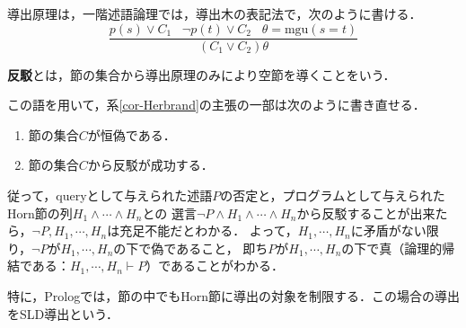 \documentclass[uplatex, dvipdfmx]{jsreport}
\begin{document}
\begin{definition}[導出：一階述語論理]
    導出原理は，一階述語論理では，導出木の表記法で，次のように書ける．
    \[ \frac{p(s)\lor C_1\;\;\;\lnot p(t)\lor C_2\;\;\;\theta=\mathrm{mgu}(s=t)}{(C_1\lor C_2)\theta} \]
\end{definition}

\begin{definition}[refutation]
    \textbf{反駁}とは，節の集合から導出原理のみにより空節を導くことをいう．
\end{definition}
\begin{remark}
    この語を用いて，系\ref{cor-Herbrand}の主張の一部は次のように書き直せる．
    \begin{enumerate}
        \item 節の集合$C$が恒偽である．
        \item 節の集合$C$から反駁が成功する．
    \end{enumerate}
    従って，queryとして与えられた述語$P$の否定と，プログラムとして与えられたHorn節の列$H_1\land\cdots\land H_n$との
    選言$\lnot P\land H_1\land\cdots\land H_n$から反駁することが出来たら，$\lnot P,H_1,\cdots,H_n$は充足不能だとわかる．
    よって，$H_1,\cdots,H_n$に矛盾がない限り，$\lnot P$が$H_1,\cdots,H_n$の下で偽であること，
    即ち$P$が$H_1,\cdots,H_n$の下で真（論理的帰結である：$H_1,\cdots,H_n\vdash P$）であることがわかる．
\end{remark}

特に，Prologでは，節の中でもHorn節に導出の対象を制限する．この場合の導出をSLD導出という．
\end{document}
